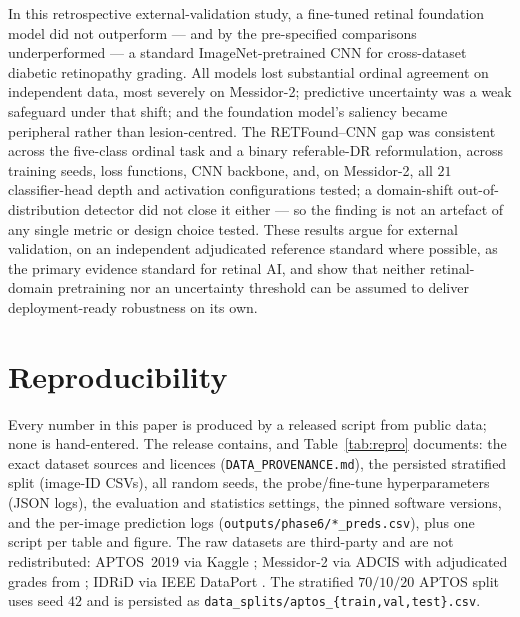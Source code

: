 \documentclass[journal]{IEEEtran}
\begin{document}
In this retrospective external-validation study, a fine-tuned retinal foundation
model did not outperform --- and by the pre-specified comparisons underperformed
--- a standard ImageNet-pretrained CNN for cross-dataset diabetic retinopathy
grading. All models lost substantial ordinal agreement on independent data, most
severely on Messidor-2; predictive uncertainty was a weak safeguard under that
shift; and the foundation model's saliency became peripheral rather than
lesion-centred. The RETFound--CNN gap was consistent across the five-class
ordinal task and a binary referable-DR reformulation, across training seeds,
loss functions, CNN backbone, and, on Messidor-2, all $21$ classifier-head depth
and activation configurations tested; a domain-shift out-of-distribution
detector did not close it either --- so the finding is not an artefact of any
single metric or design choice tested. These results argue for external
validation, on an independent adjudicated reference standard where possible,
as the primary evidence standard for retinal AI, and show that neither
retinal-domain pretraining nor an uncertainty threshold can be assumed to
deliver deployment-ready robustness on its own.


\section{Reproducibility}
\label{sec:repro}

Every number in this paper is produced by a released script from public data; none
is hand-entered. The release contains, and Table~\ref{tab:repro} documents: the
exact dataset sources and licences (\texttt{DATA\_PROVENANCE.md}), the persisted
stratified split (image-ID CSVs), all random seeds, the probe/fine-tune
hyperparameters (JSON logs), the evaluation and statistics settings, the pinned
software versions, and the per-image prediction logs
(\texttt{outputs/phase6/*\_preds.csv}), plus one script per table and figure. The
raw datasets are third-party and are not redistributed: APTOS~2019 via Kaggle
\cite{aptos2019}; Messidor-2 via ADCIS \cite{decenciere2014} with adjudicated
grades from \cite{krause2018}; IDRiD via IEEE DataPort \cite{porwal2018}. The
stratified $70/10/20$ APTOS split uses seed $42$ and is persisted as
\texttt{data\_splits/aptos\_\{train,val,test\}.csv}.
\end{document}
